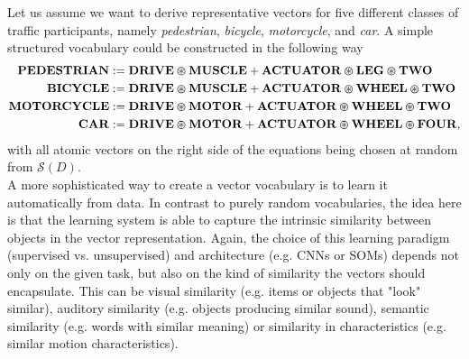 Let us assume we want to derive representative vectors for five different classes of traffic participants, namely \emph{pedestrian}, \emph{bicycle}, \emph{motorcycle},  and \emph{car}.
A simple structured vocabulary could be constructed in the following way
\begin{align*}
\mathbf{PEDESTRIAN} &:= \mathbf{DRIVE} \varoast \mathbf{MUSCLE} + \mathbf{ACTUATOR} \varoast \mathbf{LEG} \varoast \mathbf{TWO} \\ 
\mathbf{BICYCLE} &:= \mathbf{DRIVE} \varoast \mathbf{MUSCLE} + \mathbf{ACTUATOR} \varoast \mathbf{WHEEL} \varoast \mathbf{TWO}\\
\mathbf{MOTORCYCLE} &:= \mathbf{DRIVE} \varoast \mathbf{MOTOR} + \mathbf{ACTUATOR} \varoast \mathbf{WHEEL} \varoast \mathbf{TWO}\\
\mathbf{CAR} &:= \mathbf{DRIVE} \varoast \mathbf{MOTOR} + \mathbf{ACTUATOR} \varoast \mathbf{WHEEL} \varoast \mathbf{FOUR},
\end{align*}
with all atomic vectors on the right side of the equations being chosen at random from $\mathcal{S}(D)$.\\
A more sophisticated way to create a vector vocabulary is to learn it automatically from data.
In contrast to purely random vocabularies, the idea here is that the learning system is able to capture the intrinsic similarity between objects in the vector representation.
Again, the choice of this learning paradigm (supervised vs. unsupervised) and architecture (e.g. \acp{CNN} or \acp{SOM}) depends not only on the given task, but also on the kind of similarity the vectors should encapsulate.
This can be visual similarity (e.g. items or objects that "look" similar), auditory similarity (e.g. objects producing similar sound), semantic similarity (e.g. words with similar meaning) or similarity in characteristics (e.g. similar motion characteristics).

